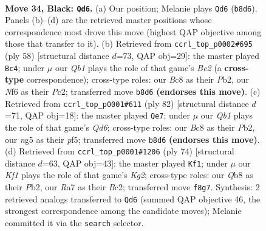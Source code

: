 \documentclass[11pt]{article}
\begin{document}
\clearpage

\begin{figure}[p]\centering
\begin{subfigure}{0.46\textwidth}\centering
\resizebox{\linewidth}{!}{%
\newchessgame
\chessboard[
  setfen={1qb2k2/r4p2/5np1/1B4Np/P7/1p4P1/3NRP1P/R6K b - - 3 34},
  showmover=false,
  pgfstyle=straightmove, color=movearrow, markmove={b8-d6}
]}
\caption{}
\end{subfigure}\hfill
\begin{subfigure}{0.46\textwidth}\centering
\resizebox{\linewidth}{!}{%
\newchessgame
\chessboard[
  setfen={3rk3/5pp1/pr6/4P3/Rn1p1p2/4bN1P/1PP1B1P1/1K1R4 w - - 1 30},
  showmover=false,
  pgfstyle=straightmove, color=movearrow, markmove={e2-c4}
]}
\caption{}
\end{subfigure}
\\[4pt]
\begin{subfigure}{0.46\textwidth}\centering
\resizebox{\linewidth}{!}{%
\newchessgame
\chessboard[
  setfen={kr1r4/1pRP4/p1bQ2pp/P4p2/4p3/6P1/1P3P2/6K1 w - - 0 42},
  showmover=false,
  pgfstyle=straightmove, color=movearrow, markmove={d6-e7}
]}
\caption{}
\end{subfigure}\hfill
\begin{subfigure}{0.46\textwidth}\centering
\resizebox{\linewidth}{!}{%
\newchessgame
\chessboard[
  setfen={8/1p4k1/p1p2r2/P3r1n1/1Q2p1b1/2P5/1PBR1PK1/8 w - - 6 38},
  showmover=false,
  pgfstyle=straightmove, color=movearrow, markmove={g2-f1}
]}
\caption{}
\end{subfigure}
\caption{\textbf{Move 34, Black: \texttt{Qd6}.} (a) Our position; Melanie plays \texttt{Qd6} (\texttt{b8d6}). Panels (b)--(d) are the retrieved master positions whose correspondence most drove this move (highest QAP objective among those that transfer to it). (b) Retrieved from \texttt{ccrl\_top\_p0002\#695} (ply 58) [structural distance $d$=73, QAP obj=29]: the master played \texttt{Bc4}; under $\mu$ our \emph{Qb1} plays the role of that game's \emph{Be2} (a \textbf{cross-type} correspondence); cross-type roles: our \emph{B}c8 as their \emph{P}b2, our \emph{N}f6 as their \emph{P}c2; transferred move \texttt{b8d6} \textbf{(endorses this move)}. (c) Retrieved from \texttt{ccrl\_top\_p0001\#611} (ply 82) [structural distance $d$=71, QAP obj=18]: the master played \texttt{Qe7}; under $\mu$ our \emph{Qb1} plays the role of that game's \emph{Qd6}; cross-type roles: our \emph{B}c8 as their \emph{P}b2, our \emph{n}g5 as their \emph{p}f5; transferred move \texttt{b8d6} \textbf{(endorses this move)}. (d) Retrieved from \texttt{ccrl\_top\_p0001\#1206} (ply 74) [structural distance $d$=63, QAP obj=43]: the master played \texttt{Kf1}; under $\mu$ our \emph{Kf1} plays the role of that game's \emph{Kg2}; cross-type roles: our \emph{Q}b8 as their \emph{P}b2, our \emph{R}a7 as their \emph{B}c2; transferred move \texttt{f8g7}. Synthesis: 2 retrieved analogs transferred to \texttt{Qd6} (summed QAP objective 46, the strongest correspondence among the candidate moves); Melanie committed it via the \texttt{search} selector.}
\label{fig:thought-m67}
\end{figure}
\end{document}
